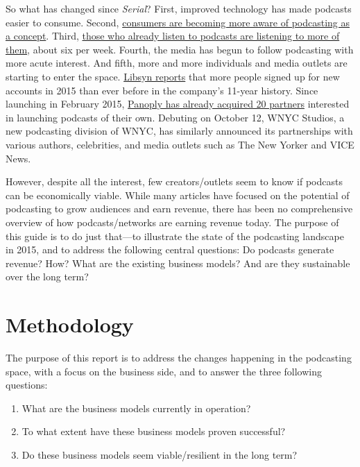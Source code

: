 \documentclass[notoc, symmetric, nobib, nols]{towcenter-guideto-book}
\begin{document}
So what has changed since \textit{Serial}? First, improved technology has made podcasts easier to consume. Second, \href{http://www.edisonresearch.com/the-podcast-consumer-2015/}{consumers are becoming more aware of podcasting as a concept}. Third, \href{http://www.edisonresearch.com/the-podcast-consumer-2015/}{those who already listen to podcasts are listening to more of them}, about six per week.\autocite{EdPCconsumer} Fourth, the media has begun to follow podcasting with more acute interest. And fifth, more and more individuals and media outlets are starting to enter the space. \href{http://www.libsyn.com/wp-content/uploads/2015/06/PRLibsynNetGrowth021915Final.pdf}{Libsyn reports} that more people signed up for new accounts in 2015 than ever before in the company's 11-year history.\autocite{libsyndata} Since launching in February 2015, \href{http://panoplymedia.tumblr.com/post/126958922613/eleven-shows-from-sports-illustrated-join-panoply}{Panoply has already acquired 20 partners} interested in launching podcasts of their own.\autocite{panoplyaudiometric} Debuting on October 12, WNYC Studios, a new podcasting division of WNYC, has similarly announced its partnerships with various authors, celebrities, and media outlets such as The New Yorker and VICE News.\autocite{wnycstudios} 

However, despite all the interest, few creators/outlets seem to know if podcasts can be economically viable. While many articles have focused on the potential of podcasting to grow audiences and earn revenue, there has been no comprehensive overview of how podcasts/networks are earning revenue today. The purpose of this guide is to do just that---to illustrate the state of the podcasting landscape in 2015, and to address the following central questions: Do podcasts generate revenue? How? What are the existing business models? And are they sustainable over the long term?

\chapter{Methodology}

The purpose of this report is to address the changes happening in the podcasting space, with a focus on the business side, and to answer the three following questions: 

\begin{enumerate}
\item What are the business models currently in operation?
\item To what extent have these business models proven successful?
\item Do these business models seem viable/resilient in the long term? 
\end{enumerate}
\end{document}
